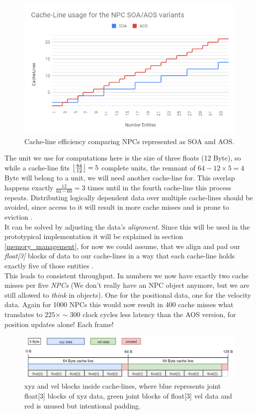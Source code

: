 \subsubsection{}
\vspace{-1cm}
\begin{figure}
	\centering
	\includegraphics[width=.6\textwidth, height=0.42\textwidth]{PICs/soa_aos_cl_usage}
	\caption{Cache-line efficiency comparing NPCs represented as SOA and AOS.}\label{soa_aos_cl_usage}
\end{figure}
The unit we use for computations here is the size of three floats (12 Byte), so while a cache-line fits $\left \lfloor \frac{64}{12} \right \rfloor=5$ complete units, the remnant of $64-12\times5 = 4$ Byte will belong to a unit, we will need another cache-line for. This overlap happens exactly $\frac{12}{64-60} = 3$ times until in the fourth cache-line this process repeats. Distributing logically dependent data over multiple cache-lines should be avoided, since access to it will result in more cache misses and is prone to eviction .\\
It can be solved by adjusting the data's \textit{alignment}. Since this will be used in the prototypical implementation it will be explained in section \ref{memory_management}, for now we could assume, that we align and pad our \textit{float[3]} blocks of data to our cache-lines in a way that each cache-line holds exactly five of those entities .\\
This leads to consistent throughput. In numbers we now have exactly two cache misses per five \textit{NPCs} (We don't really have an NPC object anymore, but we are still allowed to \textit{think} in objects). One for the positional data, one for the velocity data. Again for 1000 NPCs this would now result in 400 cache misses what translates to $225\times\sim300$ clock cycles less latency than the AOS version, for position updates alone! Each frame!
\begin{figure}[!htbp]
	\centering
	\includegraphics[width=1.0\linewidth, height=0.17\linewidth]{PICs/CacheUtilizationNPCSOA}
	\caption{xyz and vel blocks inside cache-lines, where blue represents joint float[3] blocks of xyz data, green joint blocks of float[3] vel data and red is unused but intentional padding.}\label{cache_utilization_soa}
\end{figure}
